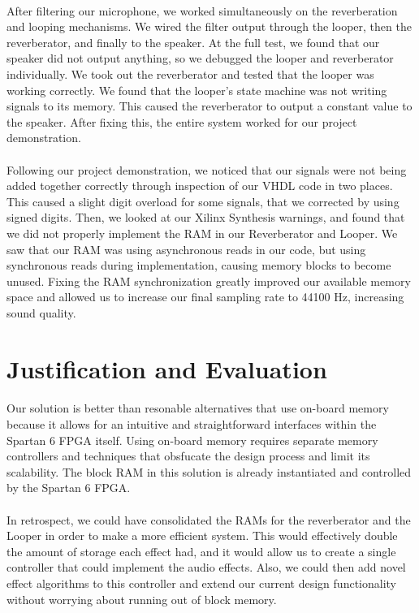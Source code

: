 \documentclass[12pt]{article}
\begin{document}
\paragraph{}
After filtering our microphone, we worked simultaneously on the reverberation and looping mechanisms. We wired the filter output through the looper, then the reverberator, and finally to the speaker. At the full test, we found that our speaker did not output anything, so we debugged the looper and reverberator individually. We took out the reverberator and tested that the looper was working correctly. We found that the looper's state machine was not writing signals to its memory. This caused the reverberator to output a constant value to the speaker. After fixing this, the entire system worked for our project demonstration.
\paragraph{}
Following our project demonstration, we noticed that our signals were not being added together correctly through inspection of our VHDL code in two places. This caused a slight digit overload for some signals, that we corrected by using signed digits. Then, we looked at our Xilinx Synthesis warnings, and found that we did not properly implement the RAM in our Reverberator and Looper. We saw that our RAM was using asynchronous reads in our code, but using synchronous reads during implementation, causing memory blocks to become unused. Fixing the RAM synchronization greatly improved our available memory space and allowed us to increase our final sampling rate to 44100 Hz, increasing sound quality.

\section{Justification and Evaluation}
\paragraph{}
Our solution is better than resonable alternatives that use on-board memory because it allows for an intuitive and straightforward interfaces within the Spartan 6 FPGA itself. Using on-board memory requires separate memory controllers and techniques that obsfucate the design process and limit its scalability. The block RAM in this solution is already instantiated and controlled by the Spartan 6 FPGA.
\paragraph{}
In retrospect, we could have consolidated the RAMs for the reverberator and the Looper in order to make a more efficient system. This would effectively double the amount of storage each effect had, and it would allow us to create a single controller that could implement the audio effects. Also, we could then add novel effect algorithms to this controller and extend our current design functionality without worrying about running out of block memory. 
\end{document}
